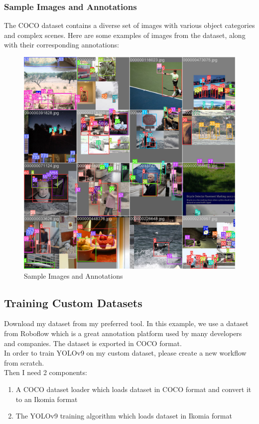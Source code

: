         \subsubsection{Sample Images and Annotations}
            The COCO dataset contains a diverse set of images with various object categories and complex scenes. Here are some examples of images from the dataset, along with their corresponding annotations:
            \begin{figure}[H]
                \centering
                \includegraphics[width=0.8\linewidth]{img/annotations.jpg}
                \caption{Sample Images and Annotations}
                \label{fig:annotations}
            \end{figure}
    \subsection{Training Custom Datasets}
        Download my dataset from my preferred tool. In this example, we use a dataset from Roboflow which is a great annotation platform used by many developers and companies. The dataset is exported in COCO format. \\
        \vspace{3mm}
        In order to train YOLOv9 on my custom dataset, please create a new workflow from scratch. \\
        \vspace{3mm}
        Then I need 2 components:
        \begin{enumerate}
            \item A COCO dataset loader which loads dataset in COCO format and convert it to an Ikomia format
            \item The YOLOv9 training algorithm which loads dataset in Ikomia format
        \end{enumerate}

